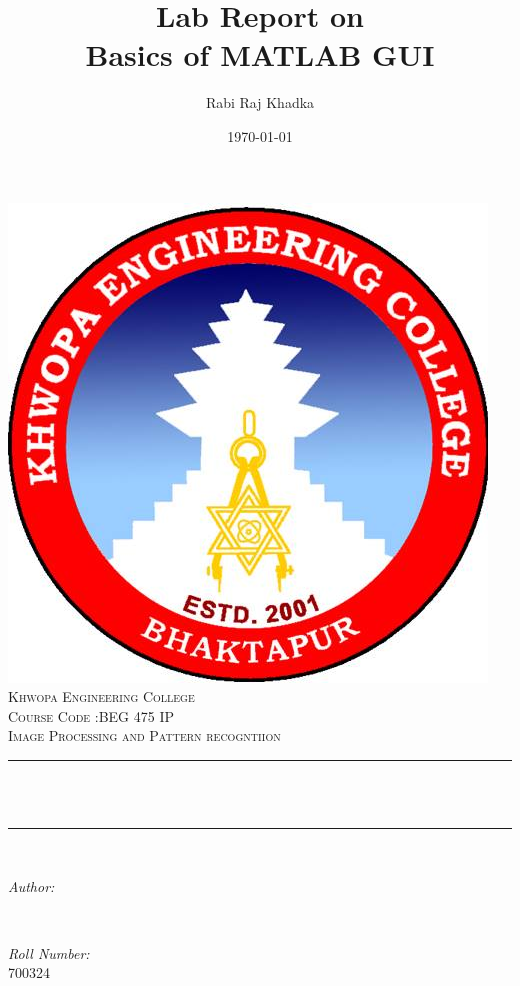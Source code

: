 \documentclass[12pt]{article}
\title{Lab Report on \\ Basics of MATLAB GUI}								%
\author{Rabi Raj Khadka}								%
\date{\today}											%
\makeatletter
\let\thetitle\@title
\let\theauthor\@author
\let\thedate\@date
\makeatother
\begin{document}

\begin{titlepage}
	\centering
    \includegraphics[scale = 0.3]{kheclogo.jpg}\\[1.0 cm]	%
    \textsc{\LARGE Khwopa Engineering College}\\[2.0 cm]	%
	\textsc{\Large Course Code :BEG 475 IP}\\[0.5 cm]				%
	\textsc{\large Image Processing and Pattern recogntiion}\\[0.5 cm]				%
	\rule{\linewidth}{0.2 mm} \\[0.4 cm]
	{ \huge \bfseries \thetitle}\\
	\rule{\linewidth}{0.2 mm} \\[3.0 cm]	
	\begin{minipage}{0.4\textwidth}
		\begin{flushleft} \large
			\emph{Author:}\\
			\theauthor
			\end{flushleft}
			\end{minipage}~
			\begin{minipage}{0.4\textwidth}
			\begin{flushright} \large
			\emph{Roll  Number:} \\
			700324									%
		\end{flushright}
	\end{minipage}\\[2 cm]
	
	{\large \thedate}\\[2 cm]
 
	\vfill
	
\end{titlepage}
\end{document}
